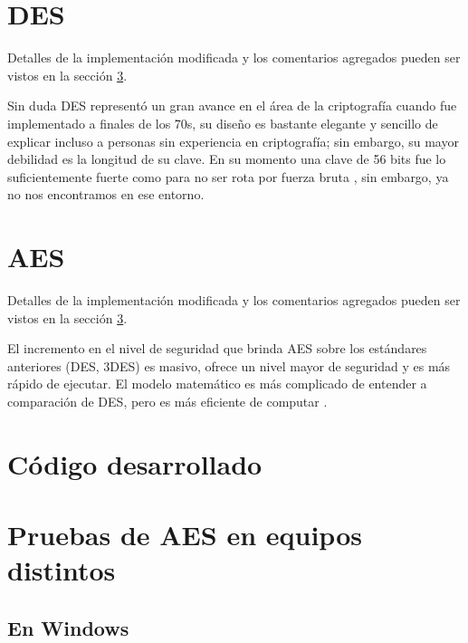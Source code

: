\documentclass{article}
\begin{document}
    \section{DES}
        
        Detalles de la implementación modificada y los comentarios agregados pueden ser vistos en la sección \ref{sec:code}.

        Sin duda DES representó un gran avance en el área de la criptografía cuando fue implementado a finales de los 70s, su diseño es bastante elegante y sencillo de explicar incluso a personas sin experiencia en criptografía; sin embargo, su mayor debilidad es la longitud de su clave. En su momento una clave de 56 bits fue lo suficientemente fuerte como para no ser rota por fuerza bruta \cite{pub1999data}, sin embargo, ya no nos encontramos en ese entorno.

    \section{AES}
        
        Detalles de la implementación modificada y los comentarios agregados pueden ser vistos en la sección \ref{sec:code}.
        
        El incremento en el nivel de seguridad que brinda AES sobre los estándares anteriores (DES, 3DES) es masivo, ofrece un nivel mayor de seguridad y es más rápido de ejecutar. El modelo matemático es más complicado de entender a comparación de DES, pero es más eficiente de computar \cite{stallings2002advanced}.

    \appendix
    \section{Código desarrollado} \label{sec:code}
        
        

    \section{Pruebas de AES en equipos distintos}

        \subsection{En Windows}
\end{document}

